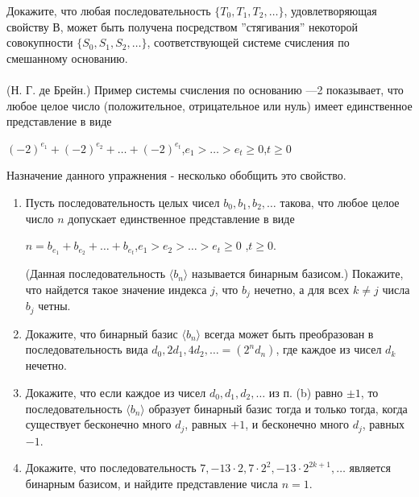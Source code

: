 Докажите, что любая последовательность $\lbrace T_{0}, T_{1}, T_{2},  \ldots \rbrace$, удовлетворяющая свойству В, может быть получена посредством ''стягивания'' некоторой совокупности $\lbrace S_{0}, S_{1}, S_{2},  \ldots \rbrace$, соответствующей системе счисления по смешанному основанию.

\paragraph{} 
(Н. Г. де Брейн.) Пример системы счисления по основанию —2 показывает, что любое целое число (положительное, отрицательное или нуль) имеет единственное представление в виде
\begin{center}
$(-2)^{e_{1}} + (-2)^{e_{2}} +  \ldots  + (-2)^{e_{t}}$,\tab $e_{1} >  \ldots  > e_{t} \geq 0$,\tab $t \geq 0$
\end{center}
Назначение данного упражнения - несколько обобщить это свойство.

\begin{enumerate}
\item Пусть последовательность целых чисел $ b_{0}, b_{1}, b_{2},  \ldots $ такова, что любое целое число $ n $ допускает единственное представление в виде
\begin{center}
$ n = b_{e_{1}} + b_{e_{2}} +  \ldots  + b_{e_{t}} $,\tab $ e_{1} > e_{2} >  \ldots  > e_{t} \geq 0 $ ,\tab $ t \geq 0  $. 
\end{center}

(Данная последовательность $\langle b_{n}\rangle $  называется бинарным базисом.) Покажите, что найдется такое значение индекса $j$, что $b_{j}$ нечетно, а для всех $k \neq j$ числа $b_{j}$ четны.

\item Докажите, что бинарный базис $\langle b_{n}\rangle $  всегда может быть преобразован в последовательность вида $d_{0}, 2d_{1}, 4d_{2},  \ldots  = (2^{n}d_{n})$, где каждое из чисел $d_{k}$ нечетно.

\item Докажите, что если каждое из чисел $d_{0}, d_{1}, d_{2},  \ldots $ из п. (b) равно $\pm 1$, то последовательность $\langle b_{n}\rangle $ образует бинарный базис тогда и только тогда, когда существует бесконечно много $d_{j}$, равных $+1$, и бесконечно много $d_{j}$, равных $-1$.

\item Докажите, что последовательность $7, -13 \cdot 2, 7 \cdot 2^{2}, -13 \cdot 2^{2k+1},  \ldots $ является бинарным базисом, и найдите представление числа $n = 1$.
\end{enumerate}

